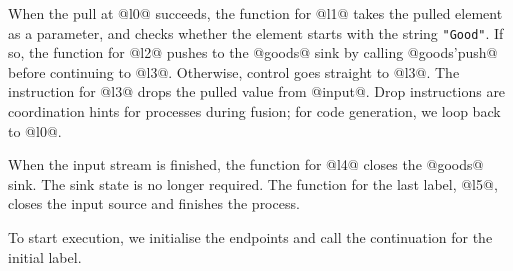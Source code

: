 When the pull at @l0@ succeeds, the function for @l1@ takes the pulled element as a parameter, and checks whether the element starts with the string \lstinline/"Good"/.
If so, the function for @l2@ pushes to the @goods@ sink by calling @goods'push@ before continuing to @l3@.
Otherwise, control goes straight to @l3@.
The instruction for @l3@ drops the pulled value from @input@.
Drop instructions are coordination hints for processes during fusion; for code generation, we loop back to @l0@.

When the input stream is finished, the function for @l4@ closes the @goods@ sink.
The sink state is no longer required.
The function for the last label, @l5@, closes the input source and finishes the process.


% 


To start execution, we initialise the endpoints and call the continuation for the initial label.


